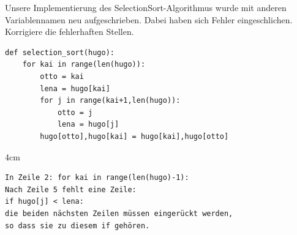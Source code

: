 \question[2]
Unsere Implementierung des SelectionSort-Algorithmus wurde mit anderen Variablennamen
neu aufgeschrieben. Dabei haben sich Fehler eingeschlichen. Korrigiere die fehlerhaften Stellen.
\begin{lstlisting}
def selection_sort(hugo):
    for kai in range(len(hugo)):
        otto = kai
        lena = hugo[kai]
        for j in range(kai+1,len(hugo)):
            otto = j
            lena = hugo[j]
        hugo[otto],hugo[kai] = hugo[kai],hugo[otto]

\end{lstlisting}
\begin{solutionbox}{4cm}
\begin{lstlisting}
In Zeile 2: for kai in range(len(hugo)-1):
Nach Zeile 5 fehlt eine Zeile:
if hugo[j] < lena:
die beiden nächsten Zeilen müssen eingerückt werden,
so dass sie zu diesem if gehören.
\end{lstlisting}
\end{solutionbox}
